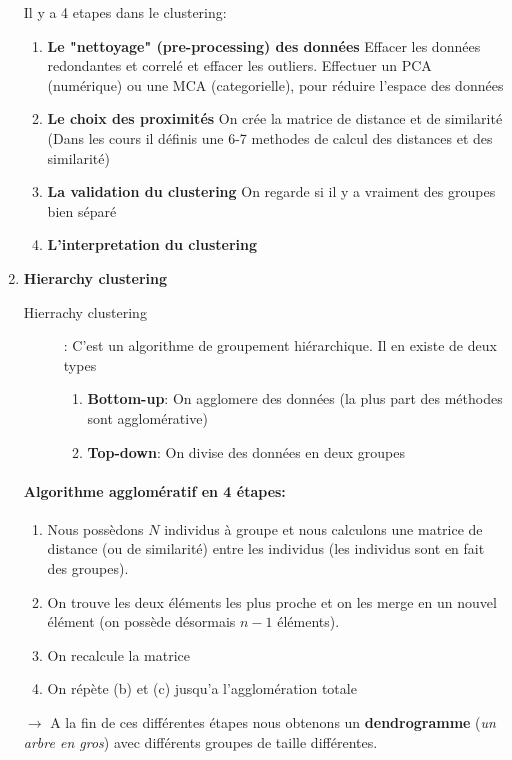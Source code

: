 \documentclass[a4paper, 11pt, onecolumn]{article}
\begin{document}
\begin{enumerate}
  \begin{description}
  \end{description}


Il y a 4 etapes dans le clustering:
\begin{enumerate}
\item \textbf{Le "nettoyage" (pre-processing) des données}
Effacer les données redondantes et correlé et effacer les outliers.
Effectuer un PCA (numérique) ou une MCA (categorielle), pour réduire l'espace des données
\item \textbf{Le choix des proximités}
On crée la matrice de distance et de similarité (Dans les cours il définis une 6-7 methodes de calcul des distances et des similarité)
\item \textbf{La validation du clustering} On regarde si il y a vraiment des groupes bien séparé
\item \textbf{L'interpretation du clustering}
\end{enumerate}



\item \textbf{Hierarchy clustering}

  \begin{description}
    \item [Hierrachy clustering] : C'est un algorithme de groupement hiérarchique. Il en existe de deux types
\begin{enumerate}
  \item \textbf{Bottom-up}: On agglomere des données (la plus part des méthodes sont agglomérative)
  \item \textbf{Top-down}: On divise des données en deux groupes
\end{enumerate}
\end{description}

\paragraph{Algorithme agglomératif en 4 étapes:}
\begin{enumerate}
\item Nous possèdons $N$ individus à groupe et nous calculons une matrice de distance (ou de similarité) entre les individus (les individus sont en fait des groupes).
\item On trouve les deux éléments les plus proche et on les merge en un nouvel élément (on possède désormais $n-1$ éléments).
\item On recalcule la matrice
\item On répète (b) et (c) jusqu'a l'agglomération totale
\end{enumerate}
$\rightarrow$ A la fin de ces différentes étapes nous obtenons un \textbf{dendrogramme} 
(\textit{un arbre en gros}) avec différents groupes de taille différentes. 


\end{enumerate}
\end{document}
